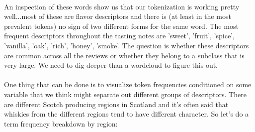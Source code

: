 \documentclass{article}
\begin{document}
	 \paragraph{} An inspection of these words show us that our tokenization is working pretty well...most of these are flavor descriptors and there is (at least in the most prevalent tokens) no sign of two different forms for the same word. The most frequent  descriptors throughout the tasting notes are 'sweet', 'fruit', 'spice', 'vanilla', 'oak', 'rich', 'honey', 'smoke'. The question is whether these descriptors are common across all the reviews or whether they belong to a subclass that is very large. We need to dig deeper than a wordcloud to figure this out.
	 \paragraph{} One thing that can be done is to visualize token frequencies conditioned on some variable that we think might separate out different groups of descriptors. There are different Scotch producing regions in Scotland and it's often said that whiskies from the different regions tend to have different character. So let's do a term frequency breakdown by region:
	 
\end{document}
